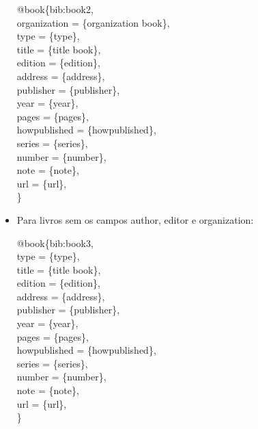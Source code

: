 \documentclass[a4paper,12pt,oneside,onecolumn]{article}
\newcommand{\formato}[1]{\begin{flushleft}{#1}\end{flushleft}}
\begin{document}
\begin{itemize}
\formato{
  @book\{bib:book2,\\
    organization = \{organization book\},\\
    type = \{type\},\\
    title = \{title book\},\\
    edition = \{edition\},\\
    address = \{address\},\\
    publisher = \{publisher\},\\
    year = \{year\},\\
    pages = \{pages\},\\
    howpublished = \{howpublished\},\\
    series = \{series\},\\
    number = \{number\},\\
    note = \{note\},\\
    url = \{url\},\\
  \}
}

\item Para livros sem os campos author, editor e organization: 

\formato{\citetext{bib:book3}}

\formato{
  @book\{bib:book3,\\
    type = \{type\},\\
    title = \{title book\},\\
    edition = \{edition\},\\
    address = \{address\},\\
    publisher = \{publisher\},\\
    year = \{year\},\\
    pages = \{pages\},\\
    howpublished = \{howpublished\},\\
    series = \{series\},\\
    number = \{number\},\\
    note = \{note\},\\
    url = \{url\},\\
  \}
}
\end{itemize}
\end{document}
